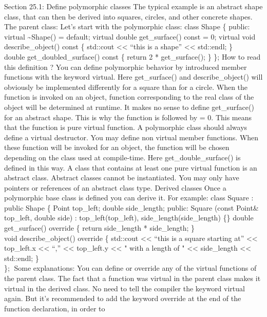 Section 25.1: Deﬁne polymorphic classes The typical example is an
abstract shape class, that can then be derived into squares, circles,
and other concrete shapes. The parent class: Let's start with the
polymorphic class: class Shape \{ public: virtual
\textasciitilde Shape() = default; virtual double get\_surface() const =
0; virtual void describe\_object() const \{ std::cout
\textless\textless{} ``this is a shape'' \textless\textless{} std::endl;
\}\\
double get\_doubled\_surface() const \{ return 2 * get\_surface(); \}
\}; How to read this deﬁnition ? You can deﬁne polymorphic behavior by
introduced member functions with the keyword virtual. Here
get\_surface() and describe\_object() will obviously be implemented
diﬀerently for a square than for a circle. When the function is invoked
on an object, function corresponding to the real class of the object
will be determined at runtime. It makes no sense to deﬁne get\_surface()
for an abstract shape. This is why the function is followed by = 0. This
means that the function is pure virtual function. A polymorphic class
should always deﬁne a virtual destructor. You may deﬁne non virtual
member functions. When these function will be invoked for an object, the
function will be chosen depending on the class used at compile-time.
Here get\_double\_surface() is deﬁned in this way. A class that contains
at least one pure virtual function is an abstract class. Abstract
classes cannot be instantiated. You may only have pointers or references
of an abstract class type. Derived classes Once a polymorphic base class
is deﬁned you can derive it. For example: class Square : public Shape \{
Point top\_left; double side\_length; public: Square (const Point\&
top\_left, double side) : top\_left(top\_left),
side\_length(side\_length) \{\} double get\_surface() override \{ return
side\_length * side\_length; \}\\
void describe\_object() override \{ std::cout \textless\textless{}
``this is a square starting at'' \textless\textless{} top\_left.x
\textless\textless{} ``,'' \textless\textless{} top\_left.y
\textless\textless{} " with a length of " \textless\textless{}
side\_length \textless\textless{} std::endl; \}\\
\}; Some explanations: You can deﬁne or override any of the virtual
functions of the parent class. The fact that a function was virtual in
the parent class makes it virtual in the derived class. No need to tell
the compiler the keyword virtual again. But it's recommended to add the
keyword override at the end of the function declaration, in order to
